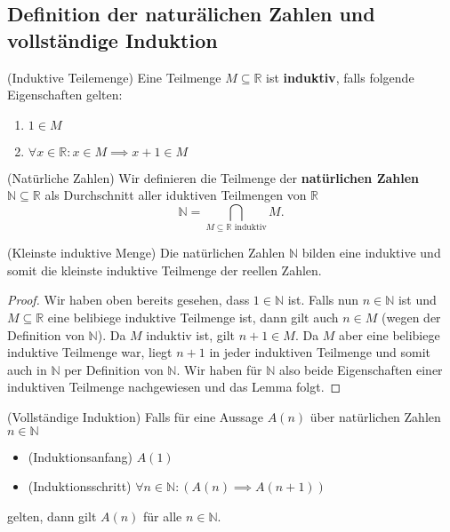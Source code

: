 \documentclass[../Analysis1_script.tex]{subfiles}
\begin{document}
\subsection{Definition der naturälichen Zahlen und vollständige Induktion}
\begin{definition}{(Induktive Teilemenge)}
	Eine Teilmenge $M \subseteq \mathbb{R}$ ist \textbf{induktiv}, falls folgende Eigenschaften gelten:
	\begin{enumerate}
		\item $1 \in M$
		\item $\forall x \in \mathbb{R} : x \in M \implies x+1 \in M$
	\end{enumerate}
\end{definition}

\begin{definition}{(Natürliche Zahlen)}
	Wir definieren die Teilmenge der \textbf{natürlichen Zahlen} $\mathbb{N} \subseteq \mathbb{R}$ als Durchschnitt aller iduktiven Teilmengen von $\mathbb{R}$
	\begin{equation}
		\mathbb {N} = \bigcap _{M \subseteq \mathbb {R} \text { induktiv}} M. 
	\end{equation}
\end{definition}

\begin{lemma}{(Kleinste induktive Menge)}\label{realn:smallest-set}
	Die natürlichen Zahlen $\mathbb{N}$ bilden eine induktive und somit die kleinste induktive Teilmenge der reellen Zahlen.
\end{lemma}

\begin{proof}
	 Wir haben oben bereits gesehen, dass $1 \in \mathbb{N}$ ist. Falls nun $n \in \mathbb{N}$ ist und $M \subseteq \mathbb{R}$ eine belibiege induktive Teilmenge ist, dann gilt auch $n \in M$ (wegen der Definition von $\mathbb{N}$). Da $M$ induktiv ist, gilt $n+1 \in M$. Da $M$ aber eine belibiege induktive Teilmenge war, liegt $n+1$ in jeder induktiven Teilmenge und somit auch in $\mathbb{N}$ per Definition von $\mathbb{N}$. Wir haben für $\mathbb{N}$ also beide Eigenschaften einer induktiven Teilmenge nachgewiesen und das Lemma folgt.
\end{proof}
 
\begin{proposition}{(Vollständige Induktion)}\label{realn:induktion}
	Falls für eine Aussage $A(n)$ über natürlichen Zahlen $n \in \mathbb{N}$
	\begin{itemize}
		\item (Induktionsanfang) $A(1)$ 
		\item (Induktionsschritt) $\forall n \in \mathbb{N} : (A(n) \implies A(n+1))$
	\end{itemize}
	gelten, dann gilt $A(n)$ für alle $n \in \mathbb{N}$. 
\end{proposition}
\end{document}
